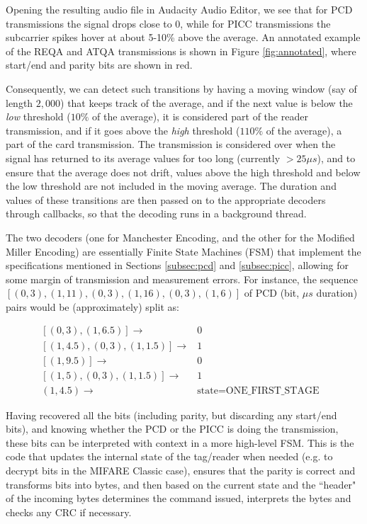 \documentclass[fleqn,10pt]{SelfArx} %
\newcommand{\ms}{\ensuremath{\mu s} }
\begin{document}
Opening the resulting audio file in Audacity Audio Editor, we see that for PCD transmissions the signal drops close to 0, while for PICC transmissions the subcarrier spikes hover at about 5-10\% above the average. An annotated example of the REQA and ATQA transmissions is shown in Figure \ref{fig:annotated}, where start/end and parity bits are shown in red. 


Consequently, we can detect such transitions by having a moving window (say of length $2,000$) that keeps track of the average, and if the next value is below the {\em low} threshold ($10\%$ of the average), it is considered part of the reader transmission, and if it goes above the {\em high} threshold ($110\%$ of the average), a part of the card transmission. The transmission is considered over when the signal has returned to its average values for too long (currently $>25\ms$), and to ensure that the average does not drift, values above the high threshold and below the low threshold are not included in the moving average. The duration and values of these transitions are then passed on to the appropriate decoders through callbacks, so that the decoding runs in a background thread.

The two decoders (one for Manchester Encoding, and the other for the Modified Miller Encoding) are essentially Finite State Machines (FSM) that implement the specifications mentioned in Sections \ref{subsec:pcd} and \ref{subsec:picc}, allowing for some margin of transmission and measurement errors. For instance, the sequence $[(0, 3), (1, 11), (0, 3), (1, 16), (0, 3), (1, 6)]$ of PCD (bit, \ms duration) pairs would be (approximately) split as:

\begin{align}
\nonumber [(0, 3), (1, 6.5)] \rightarrow& 0&\\
\nonumber [(1, 4.5), (0, 3), (1, 1.5)]\rightarrow & 1&\\
\nonumber [(1, 9.5)] \rightarrow & 0 &\\
\nonumber [(1, 5), (0, 3), (1, 1.5)] \rightarrow & 1 &\\
\nonumber  (1, 4.5) \rightarrow & \text{state=ONE\_FIRST\_STAGE} &
\end{align}

Having recovered all the bits (including parity, but discarding any start/end bits), and knowing whether the PCD or the PICC is doing the transmission, these bits can be interpreted with context in a more high-level FSM. This is the code that updates the internal state of the tag/reader when needed (e.g. to decrypt bits in the MIFARE Classic case), ensures that the parity is correct and transforms bits into bytes, and then based on the current state and the ``header" of the incoming bytes determines the command issued, interprets the bytes and checks any CRC if necessary. 
\end{document}
